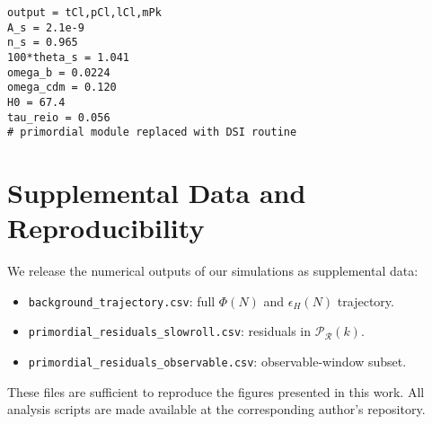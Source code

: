 \documentclass[reprint, amsmath, amssymb, aps, prd, nofootinbib]{revtex4-2}
\begin{document}
\begin{verbatim}
output = tCl,pCl,lCl,mPk
A_s = 2.1e-9
n_s = 0.965
100*theta_s = 1.041
omega_b = 0.0224
omega_cdm = 0.120
H0 = 67.4
tau_reio = 0.056
# primordial module replaced with DSI routine
\end{verbatim}

\section{Supplemental Data and Reproducibility}

We release the numerical outputs of our simulations as supplemental data:
\begin{itemize}
    \item \texttt{background\_trajectory.csv}: full $\Phi(N)$ and $\epsilon_H(N)$ trajectory.
    \item \texttt{primordial\_residuals\_slowroll.csv}: residuals in $\mathcal{P}_\mathcal{R}(k)$.
    \item \texttt{primordial\_residuals\_observable.csv}: observable-window subset.
\end{itemize}

These files are sufficient to reproduce the figures presented in this work.  
All analysis scripts are made available at the corresponding author’s repository.


\end{document}
